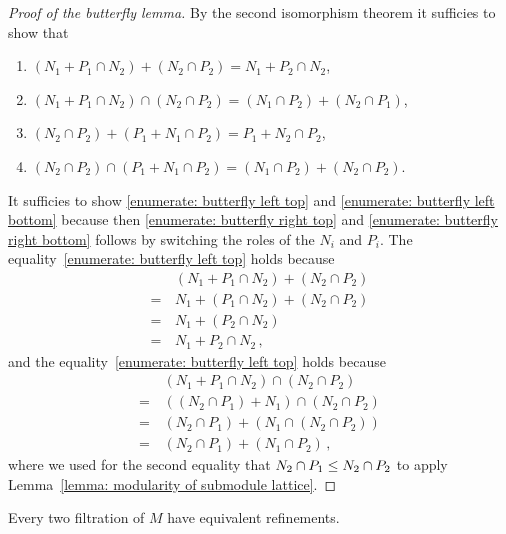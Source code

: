 \begin{proof}[Proof of the butterfly lemma]
  By the second isomorphism theorem it sufficies to show that 
  \begin{enumerate}
    \item
      \label{enumerate: butterfly left top}
      $(N_1 + P_1 \cap N_2) + (N_2 \cap P_2) = N_1 + P_2 \cap N_2$,
    \item
      \label{enumerate: butterfly left bottom}
      $(N_1 + P_1 \cap N_2) \cap (N_2 \cap P_2) = (N_1 \cap P_2) + (N_2 \cap P_1)$,
    \item
      \label{enumerate: butterfly right top}
      $(N_2 \cap P_2) + (P_1 + N_1 \cap P_2) = P_1 + N_2 \cap P_2$,
    \item
      \label{enumerate: butterfly right bottom}
      $(N_2 \cap P_2) \cap (P_1 + N_1 \cap P_2) = (N_1 \cap P_2) + (N_2 \cap P_2)$.
  \end{enumerate}
  It sufficies to show \ref*{enumerate: butterfly left top} and \ref*{enumerate: butterfly left bottom} because then \ref*{enumerate: butterfly right top} and \ref*{enumerate: butterfly right bottom} follows by switching the roles of the $N_i$ and $P_i$.
  The equality~\ref*{enumerate: butterfly left top} holds because
  \begin{align*}
     &\,  (N_1 + P_1 \cap N_2) + (N_2 \cap P_2) \\
    =&\,  N_1 + (P_1 \cap N_2) + (N_2 \cap P_2) \\
    =&\,  N_1 + (P_2 \cap N_2)                  \\
    =&\,  N_1 + P_2 \cap N_2 \,,
  \end{align*}
  and the equality~\ref*{enumerate: butterfly left top} holds because
  \begin{align*}
     &\,  (N_1 + P_1 \cap N_2) \cap (N_2 \cap P_2)    \\
    =&\,  ((N_2 \cap P_1) + N_1) \cap (N_2 \cap P_2)  \\
    =&\,  (N_2 \cap P_1) + (N_1 \cap (N_2 \cap P_2))  \\
    =&\,  (N_2 \cap P_1) + (N_1 \cap P_2) \,,
  \end{align*}
  where we used for the second equality that $N_2 \cap P_1 \leq N_2 \cap P_2$ to apply Lemma~\ref{lemma: modularity of submodule lattice}.
\end{proof}


\begin{theorem}[Schreier]
  \label{theorem: Schreiers theorem}
  Every two filtration of $M$ have equivalent refinements.
\end{theorem}


